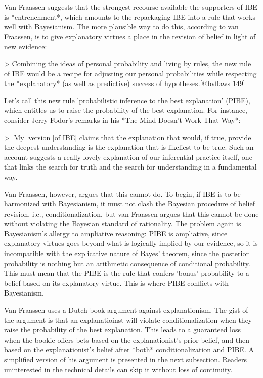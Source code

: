Van Fraassen suggests that the strongest recourse available the
supporters of IBE is *entrenchment*, which amounts to the repackaging
IBE into a rule that works well with Bayesianism. The more plausible way
to do this, according to van Fraassen, is to give explanatory virtues a
place in the revision of belief in light of new evidence:

\textgreater{} Combining the ideas of personal probability and living by
rules, the new rule of IBE would be a recipe for adjusting our personal
probabilities while respecting the *explanatory* (as well as predictive)
success of hypotheses.{[}@bvflaws 149{]}

Let's call this new rule 'probabilistic inference to the best
explanation' (PIBE), which entitles us to raise the probability of the
best explanation. For instance, consider Jerry Fodor's remarks in his
*The Mind Doesn't Work That Way*:

\textgreater{} {[}My{]} version {[}of IBE{]} claims that the explanation
that would, if true, provide the deepest understanding is the
explanation that is likeliest to be true. Such an account suggests a
really lovely explanation of our inferential practice itself, one that
links the search for truth and the search for understanding in a
fundamental way.

Van Fraassen, however, argues that this cannot do. To begin, if IBE is
to be harmonized with Bayesianism, it must not clash the Bayesian
procedure of belief revision, i.e., conditionalization, but van Fraassen
argues that this cannot be done without violating the Bayesian standard
of rationality. The problem again is Bayesianism's allergy to ampliative
reasoning: PIBE is ampliative, since explanatory virtues goes beyond
what is logically implied by our evidence, so it is incompatible with
the explicative nature of Bayes' theorem, since the posterior
probability is nothing but an arithmetic consequence of conditional
probability. This must mean that the PIBE is the rule that confers
'bonus' probability to a belief based on its explanatory virtue. This is
where PIBE conflicts with Bayesianism.

Van Fraassen uses a Dutch book argument against explanationism. The gist
of the argument is that an explanatioinst will violate
conditionalization when they raise the probability of the best
explanation. This leads to a guaranteed loss when the bookie offers bets
based on the explanationist's prior belief, and then based on the
explanationist's belief after *both* conditionalization and PIBE. A
simplified version of his argument is presented in the next subsection.
Readers uninterested in the technical details can skip it without loss
of continuity.

